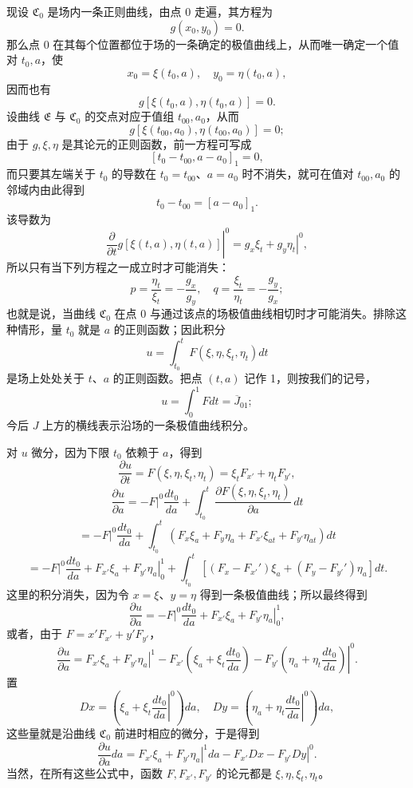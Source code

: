 \documentclass[11pt,a4paper,leqno]{article}
\begin{document}
现设 $\mathfrak{C}_0$ 是场内一条正则曲线，由点 0 走遍，其方程为
\[
g(x_0,y_0)=0.
\]
那么点 0 在其每个位置都位于场的一条确定的极值曲线上，从而唯一确定一个值对 $t_0,a$，使
\[
x_0=\xi(t_0,a),\quad y_0=\eta(t_0,a),
\]
因而也有
\[
g[\xi(t_0,a),\eta(t_0,a)]=0.
\]
设曲线 $\mathfrak{E}$ 与 $\mathfrak{C}_0$ 的交点对应于值组 $t_{00},a_0$，从而
\[
g[\xi(t_{00},a_0),\eta(t_{00},a_0)]=0;
\]
由于 $g,\xi,\eta$ 是其论元的正则函数，前一方程可写成
\[
[t_0-t_{00},a-a_0]_1=0,
\]
而只要其左端关于 $t_0$ 的导数在 $t_0=t_{00}$、$a=a_0$ 时不消失，就可在值对 $t_{00},a_0$ 的邻域内由此得到
\[
t_0-t_{00}=[a-a_0]_1.
\]
该导数为
\[
\left.\frac{\partial}{\partial t}g[\xi(t,a),\eta(t,a)]\right|^0
=\left.g_x\xi_t+g_y\eta_t\right|^0,
\]
所以只有当下列方程之一成立时才可能消失：
\[
p=\frac{\eta_t}{\xi_t}=-\frac{g_x}{g_y},
\quad q=\frac{\xi_t}{\eta_t}=-\frac{g_y}{g_x};
\]
也就是说，当曲线 $\mathfrak{C}_0$ 在点 0 与通过该点的场极值曲线相切时才可能消失。排除这种情形，量 $t_0$ 就是 $a$ 的正则函数；因此积分
\[
u=\int_{t_0}^{t}F(\xi,\eta,\xi_t,\eta_t)dt
\]
是场上处处关于 $t$、$a$ 的正则函数。把点 $(t,a)$ 记作 1，则按我们的记号，
\[
u=\int_0^1 Fdt=\overline{J}_{01};
\]
今后 $J$ 上方的横线表示沿场的一条极值曲线积分。

对 $u$ 微分，因为下限 $t_0$ 依赖于 $a$，得到
\[
\frac{\partial u}{\partial t}=F(\xi,\eta,\xi_t,\eta_t)=\xi_tF_{x'}+\eta_tF_{y'},
\]
\begin{equation}\tag{30}
\frac{\partial u}{\partial a}
=-\left.F\right|^0\frac{dt_0}{da}
+\int_{t_0}^{t}\frac{\partial F(\xi,\eta,\xi_t,\eta_t)}{\partial a}\,dt
\end{equation}
\[
=-\left.F\right|^0\frac{dt_0}{da}
+\int_{t_0}^{t}\left(F_x\xi_a+F_y\eta_a+F_{x'}\xi_{at}+F_{y'}\eta_{at}\right)dt
\]
\begin{equation}\tag{30}
=-\left.F\right|^0\frac{dt_0}{da}
+\left.F_{x'}\xi_a+F_{y'}\eta_a\right|_0^1
+\int_{t_0}^{t}\left[(F_x-F_{x'}')\xi_a+(F_y-F_{y'}')\eta_a\right]dt.
\end{equation}
这里的积分消失，因为令 $x=\xi$、$y=\eta$ 得到一条极值曲线；所以最终得到
\begin{equation}\tag{31}
\frac{\partial u}{\partial a}
=-\left.F\right|^0\frac{dt_0}{da}
+\left.F_{x'}\xi_a+F_{y'}\eta_a\right|_0^1,
\end{equation}
或者，由于 $F=x'F_{x'}+y'F_{y'}$，
\[
\frac{\partial u}{\partial a}
=\left.F_{x'}\xi_a+F_{y'}\eta_a\right|^1
-\left.F_{x'}\left(\xi_a+\xi_t\frac{dt_0}{da}\right)
-F_{y'}\left(\eta_a+\eta_t\frac{dt_0}{da}\right)\right|^0.
\]
置
\[
Dx=\left(\xi_a+\xi_t\left.\frac{dt_0}{da}\right|^0\right)da,
\quad
Dy=\left(\eta_a+\eta_t\left.\frac{dt_0}{da}\right|^0\right)da,
\]
这些量就是沿曲线 $\mathfrak{C}_0$ 前进时相应的微分，于是得到
\begin{equation}\tag{32}
\frac{\partial u}{\partial a}da=
\left.F_{x'}\xi_a+F_{y'}\eta_a\right|^1da
-\left.F_{x'}Dx-F_{y'}Dy\right|^0.
\end{equation}
当然，在所有这些公式中，函数 $F,F_{x'},F_{y'}$ 的论元都是 $\xi,\eta,\xi_t,\eta_t$。
\end{document}
